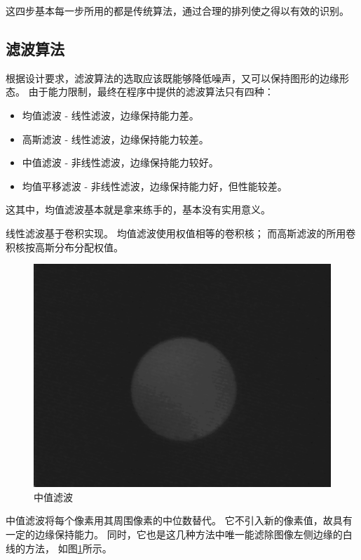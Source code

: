 \documentclass[12pt,a4paper]{report}
\begin{document}
这四步基本每一步所用的都是传统算法，通过合理的排列使之得以有效的识别。

\subsection{滤波算法}

根据设计要求，滤波算法的选取应该既能够降低噪声，又可以保持图形的边缘形态。
由于能力限制，最终在程序中提供的滤波算法只有四种：
\begin{itemize}
    \item 均值滤波 - 线性滤波，边缘保持能力差。
    \item 高斯滤波 - 线性滤波，边缘保持能力较差。
    \item 中值滤波 - 非线性滤波，边缘保持能力较好。
    \item 均值平移滤波 - 非线性滤波，边缘保持能力好，但性能较差。
\end{itemize}
这其中，均值滤波基本就是拿来练手的，基本没有实用意义。

线性滤波基于卷积\cite{KernelWiki}实现。
均值滤波使用权值相等的卷积核；
而高斯滤波的所用卷积核按高斯分布分配权值。

\begin{figure}[!htb]
    \centering
    \includegraphics[width = 0.6\linewidth]{median.png}
    \caption{中值滤波}\label{fig:median}
\end{figure}

中值滤波将每个像素用其周围像素的中位数替代。
它不引入新的像素值，故具有一定的边缘保持能力。
同时，它也是这几种方法中唯一能滤除图像左侧边缘的白线的方法，
如图\ref{fig:median}所示。
\end{document}
